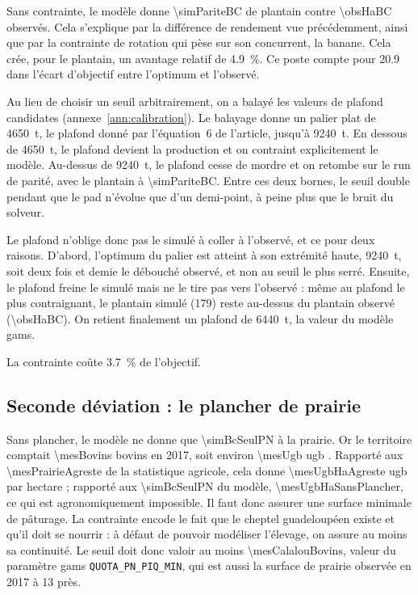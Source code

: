 Sans contrainte, le modèle donne \SI{\simPariteBC}{\ha} de plantain contre \SI{\obsHaBC}{\ha}
observés. Cela s'explique par la différence de rendement vue précédemment, ainsi que par la
contrainte de rotation qui pèse sur son concurrent, la banane. Cela crée, pour le plantain, un
avantage relatif de \SI{4.9}{\percent}. Ce poste compte pour \SI{20.9}{\mega\euros} dans l'écart
d'objectif entre l'optimum et l'observé.

Au lieu de choisir un seuil arbitrairement, on a balayé les valeurs de plafond candidates
(annexe~\ref{ann:calibration}). Le balayage donne un palier plat de \SI{4650}{\tonne}, le plafond
donné par l'équation~6 de l'article, jusqu'à \SI{9240}{\tonne}. En dessous de \SI{4650}{\tonne},
le plafond devient la production et on contraint explicitement le modèle. Au-dessus de
\SI{9240}{\tonne}, le plafond cesse de mordre et on retombe sur le run de parité, avec le
plantain à \SI{\simPariteBC}{\ha}. Entre ces deux bornes, le seuil double pendant que le
\gls{pad} n'évolue que d'un demi-point, à peine plus que le bruit du solveur.

Le plafond n'oblige donc pas le simulé à coller à l'observé, et ce pour deux raisons. D'abord,
l'optimum du palier est atteint à son extrémité haute, \SI{9240}{\tonne}, soit deux fois et demie
le débouché observé, et non au seuil le plus serré. Ensuite, le plafond freine le simulé mais ne
le tire pas vers l'observé : même au plafond le plus contraignant, le plantain simulé
(\SI{179}{\ha}) reste au-dessus du plantain observé (\SI{\obsHaBC}{\ha}). On retient finalement
un plafond de \SI{6440}{\tonne}, la valeur du modèle \gls{gams}.

La contrainte coûte \SI{3.7}{\percent} de l'objectif.

\subsection*{Seconde déviation : le plancher de prairie}

Sans plancher, le modèle ne donne que \SI{\simBcSeulPN}{\ha} à la prairie. Or le territoire
comptait \num{\mesBovins} bovins en 2017, soit environ \num{\mesUgb} \gls{ugb}
\parencite{agreste2019}. Rapporté aux \SI{\mesPrairieAgreste}{\ha} de la statistique agricole,
cela donne \num{\mesUgbHaAgreste} \gls{ugb} par hectare ; rapporté aux \SI{\simBcSeulPN}{\ha} du
modèle, \num{\mesUgbHaSansPlancher}, ce qui est agronomiquement impossible. Il faut donc assurer
une surface minimale de pâturage. La contrainte encode le fait que le cheptel guadeloupéen
existe et qu'il doit se nourrir : à défaut de pouvoir modéliser l'élevage, on assure au moins sa
continuité. Le seuil doit donc valoir au moins \SI{\mesCalalouBovins}{\ha}, valeur du paramètre
\gls{gams} \texttt{QUOTA\_PN\_PIQ\_MIN}, qui est aussi la surface de prairie observée en 2017 à
\SI{13}{\ha} près.

